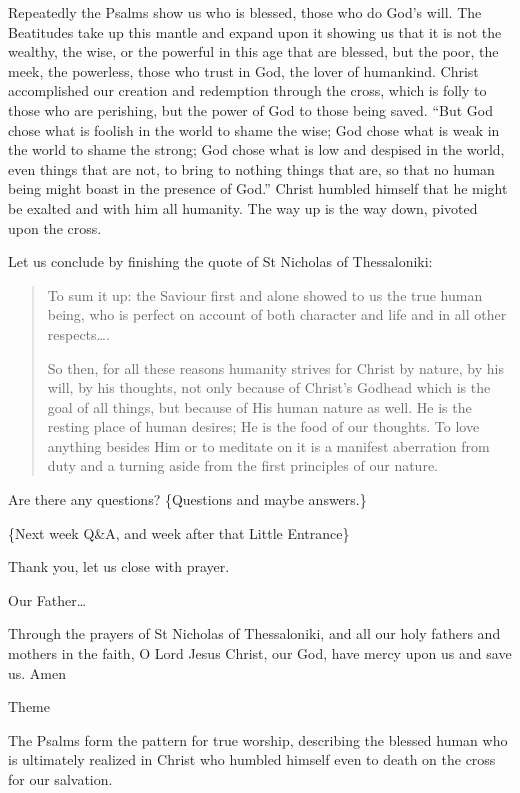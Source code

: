 \documentclass[
]{article}
\begin{document}
Repeatedly the Psalms show us who is blessed, those who do God's will.
The Beatitudes take up this mantle and expand upon it showing us that it
is not the wealthy, the wise, or the powerful in this age that are
blessed, but the poor, the meek, the powerless, those who trust in God,
the lover of humankind. Christ accomplished our creation and redemption
through the cross, which is folly to those who are perishing, but the
power of God to those being saved. ``But God chose what is foolish in
the world to shame the wise; God chose what is weak in the world to
shame the strong; God chose what is low and despised in the world, even
things that are not, to bring to nothing things that are, so that no
human being might boast in the presence of God.'' Christ humbled himself
that he might be exalted and with him all humanity. The way up is the
way down, pivoted upon the cross.

Let us conclude by finishing the quote of St Nicholas of Thessaloniki:

\begin{quote}
To sum it up: the Saviour first and alone showed to us the true human
being, who is perfect on account of both character and life and in all
other respects\ldots.

So then, for all these reasons humanity strives for Christ by nature, by
his will, by his thoughts, not only because of Christ's Godhead which is
the goal of all things, but because of His human nature as well. He is
the resting place of human desires; He is the food of our thoughts. To
love anything besides Him or to meditate on it is a manifest aberration
from duty and a turning aside from the first principles of our nature.
\end{quote}

Are there any questions? \{Questions and maybe answers.\}

\{Next week Q\&A, and week after that Little Entrance\}

Thank you, let us close with prayer.

Our Father\ldots{}

Through the prayers of St Nicholas of Thessaloniki, and all our holy
fathers and mothers in the faith, O Lord Jesus Christ, our God, have
mercy upon us and save us. Amen

Theme

The Psalms form the pattern for true worship, describing the blessed
human who is ultimately realized in Christ who humbled himself even to
death on the cross for our salvation.
\end{document}
